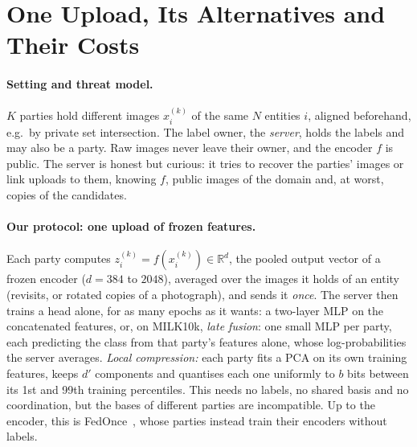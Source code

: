 \section{One Upload, Its Alternatives and Their Costs}\label{sec:method}

\paragraph{Setting and threat model.}
$K$ parties hold different images $x_i^{(k)}$ of the same $N$ entities $i$, aligned beforehand, e.g.\ by private set intersection. The label owner, the \emph{server}, holds the labels and may also be a party. Raw images never leave their owner, and the encoder $f$ is public. The server is honest but curious: it tries to recover the parties' images or link uploads to them, knowing $f$, public images of the domain and, at worst, copies of the candidates.

\paragraph{Our protocol: one upload of frozen features.}\label{sec:r1}
Each party computes $z_i^{(k)}=f(x_i^{(k)})\in\mathbb{R}^{d}$, the pooled output vector of a frozen encoder ($d=384$ to $2048$), averaged over the images it holds of an entity (revisits, or rotated copies of a photograph), and sends it \emph{once}. The server then trains a head alone, for as many epochs as it wants: a two-layer MLP on the concatenated features, or, on MILK10k, \emph{late fusion}: one small MLP per party, each predicting the class from that party's features alone, whose log-probabilities the server averages. \emph{Local compression:} each party fits a PCA on its own training features, keeps $d'$ components and quantises each one uniformly to $b$ bits between its 1st and 99th training percentiles. This needs no labels, no shared basis and no coordination, but the bases of different parties are incompatible. Up to the encoder, this is FedOnce~\cite{wu2022fedonce}, whose parties instead train their encoders without labels.

